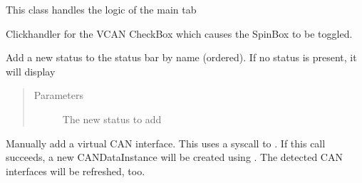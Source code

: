 \documentclass[letterpaper,10pt,english]{sphinxmanual}
\begin{document}
\begin{fulllineitems}
\label{\detokenize{src:src.MainTab.MainTab}}
This class handles the logic of the main tab

\begin{fulllineitems}
\label{\detokenize{src:src.MainTab.MainTab.VCANCheckboxChanged}}
Clickhandler for the VCAN CheckBox which causes the SpinBox to be toggled.

\end{fulllineitems}


\begin{fulllineitems}
\label{\detokenize{src:src.MainTab.MainTab.addApplicationStatus}}
Add a new status to the status bar by name (ordered).
If no status is present, it will display 
\begin{quote}\begin{description}
\item[{Parameters}] \leavevmode
{} \textendash{} The new status to add

\end{description}\end{quote}

\end{fulllineitems}


\begin{fulllineitems}
\label{\detokenize{src:src.MainTab.MainTab.addVCANInterface}}
Manually add a virtual CAN interface. This uses a syscall to .
If this call succeeds, a new CANDataInstance will be created using .
The detected CAN interfaces will be refreshed, too.

\end{fulllineitems}



\end{fulllineitems}
\end{document}
